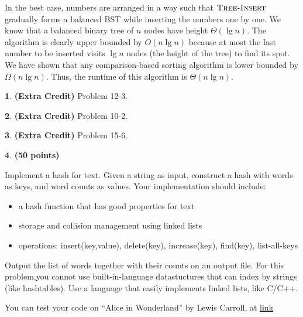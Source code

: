 \documentclass[11pt]{article}
\theoremstyle{definition}
\theoremstyle{theorem}
\newtheorem{prob}{}
\begin{document}
In the best case, numbers are arranged in a way such that $\textproc{\textsc{Tree-Insert}}$ gradually forms a balanced BST while inserting the numbers one by one. We know that a balanced binary tree of $n$ nodes have height $\Theta{(\lg n)}$. The algorithm is clearly upper bounded by $O(n \lg n)$ because at most the last number to be inserted visits $\lg n$ nodes (the height of the tree) to find its spot. We have shown that any comparison-based sorting algorithm is lower bounded by $\Omega{(n \lg n)}$. Thus, the runtime of this algorithm is $\Theta{(n \lg n)}$.


\newpage
\begin{prob} \textbf{(Extra Credit)} Problem 12-3.
\end{prob}

\begin{prob} \textbf{(Extra Credit)} Problem 10-2.
\end{prob}

\begin{prob} \textbf{(Extra Credit)} Problem 15-6.
\end{prob}

\newpage
\begin{prob} \textbf{(50 points)}
\end{prob}

\noindent Implement a hash for text.  Given a string as input,  construct a hash with words as keys, and word counts as values.  Your implementation should include:

\begin{itemize}
\item a hash function that has good properties for text

\item storage and collision management using linked lists

\item operations:  insert(key,value), delete(key), increase(key), find(key), list-all-keys
\end{itemize}

\noindent Output the list of words together with their counts on an output file.  For this problem,you  cannot  use  built-in-language  datastuctures  that  can  index  by  strings  (like  hashtables).  Use a language that easily implements linked lists, like C/C++.

\noindent You can test your code on “Alice in Wonderland” by Lewis Carroll, at \href{http://www.ccs.neu.edu/home/vip/teach/Algorithms/7_hash_RBtree_simpleDS/hw_hash_RBtree/alice_in_wonderland.txt}{link}
\end{document}
